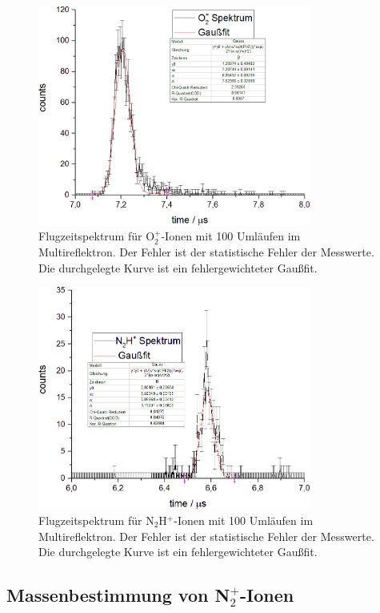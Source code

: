 \documentclass[numbers=noenddot,a4paper,notitlepage,twoside,BCOR15mm]{scrartcl}
\begin{document}
	\begin{figure}[!h]
		\centering
		\includegraphics[width=0.8\textwidth]{pics/O2}
		\caption{Flugzeitspektrum für O${}_2^+$-Ionen mit 100 Umläufen im Multireflektron. Der Fehler ist der statistische Fehler der Messwerte. Die durchgelegte Kurve ist ein fehlergewichteter Gaußfit.}
		\label{abb:O2}
	\end{figure}
	
	\begin{figure}[!h]
		\centering
		\includegraphics[width=0.8\textwidth]{pics/N2H}
		\caption{Flugzeitspektrum für N${}_2$H$^+$-Ionen mit 100 Umläufen im Multireflektron. Der Fehler ist der statistische Fehler der Messwerte. Die durchgelegte Kurve ist ein fehlergewichteter Gaußfit.}
		\label{abb:N2H}
	\end{figure}
	\clearpage
	
	\subsection{Massenbestimmung von N$_2^+$-Ionen}
	
\end{document}
